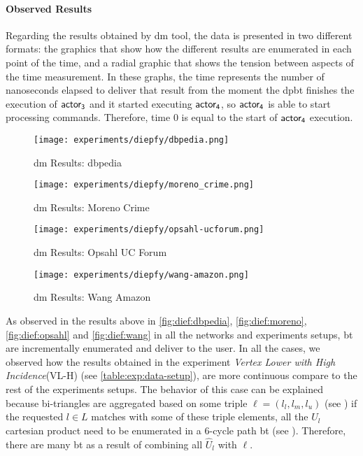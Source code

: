  \paragraph{Observed Results}\label{sub:sec:res:e1}
 Regarding the results obtained by \acrshort{dm} tool, the data is presented in two different formats: the graphics that show 
 how the different results are enumerated in each point of the time, and a radial graphic that shows the tension between aspects of the time measurement.
 In these graphs, the time represents the number of nanoseconds elapsed to deliver that result from the moment the \acrshort{dpbt} finishes the execution of $\mathsf{actor_3}$ and it started executing $\mathsf{actor_4}$, so $\mathsf{actor_4}$ is able to start processing commands. 
 Therefore, time $0$ is equal to the start of $\mathsf{actor_4}$ execution.
 
 \begin{figure}[!htb]
   \centering
   \begin{minipage}{0.5\textwidth}
    \texttt{[image: experiments/diepfy/dbpedia.png]}
     \caption{\acrshort{dm} Results: \acrshort{dbpedia}}
     \label{fig:dief:dbpedia}
   \end{minipage}%
   \begin{minipage}{0.5\textwidth}
    \texttt{[image: experiments/diepfy/moreno\_crime.png]}
     \caption{\acrshort{dm} Results: Moreno Crime}
     \label{fig:dief:moreno}
   \end{minipage}
 \end{figure}
 \begin{figure}[!htb]
   \centering
   \begin{minipage}{0.5\textwidth}
    \texttt{[image: experiments/diepfy/opsahl-ucforum.png]}
     \caption{\acrshort{dm} Results: Opsahl UC Forum}
     \label{fig:dief:opsahl}
   \end{minipage}%
   \begin{minipage}{0.5\textwidth}
     \texttt{[image: experiments/diepfy/wang-amazon.png]}
      \caption{\acrshort{dm} Results: Wang Amazon}
      \label{fig:dief:wang}
    \end{minipage}
  \end{figure}
 
 As observed in the results above in \autoref{fig:dief:dbpedia}, \autoref{fig:dief:moreno}, \autoref{fig:dief:opsahl} and \autoref{fig:dief:wang} in all the networks and experiments setups, \acrshort{bt} are incrementally enumerated and deliver to the user. 
 In all the cases, we observed how the results obtained in the experiment \emph{Vertex Lower with High Incidence}(VL-H) (see \autoref{table:exp:data-setup}), are more continuous compare to the rest of the experiments setups. 
 The behavior of this case can be explained because bi-triangles are aggregated based on some triple $\ell = (l_l,l_m,l_u)$ (see ) if the requested $l \in L$ matches with some of these triple elements, all the $\hat{U}_l$ cartesian product need to be enumerated in a 6-cycle path \acrshort{bt} (see ). Therefore, there are many \acrshort{bt} as a result of combining all $\hat{U}_l$ with $\ell$.
 
